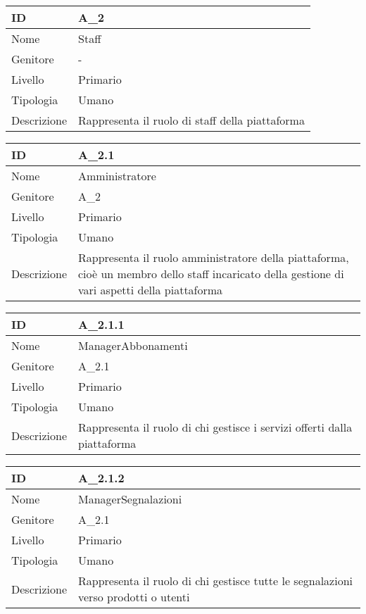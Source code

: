 \begin{center}
\begin{tabular}{ |p{2cm}|p{10cm}|  }
\hline
ID & A\_2 \\\hline
Nome & Staff\\\hline
Genitore & -\\\hline
Livello &  Primario \\\hline
Tipologia & Umano \\\hline
Descrizione &  Rappresenta il ruolo di staff della piattaforma \\\hline
\end{tabular}
\label{table_attore:2}\newline

\begin{tabular}{ |p{2cm}|p{10cm}|  }
\hline
ID & A\_2.1 \\\hline
Nome & Amministratore\\\hline
Genitore & A\_2\\\hline
Livello &  Primario \\\hline
Tipologia & Umano \\\hline
Descrizione &  Rappresenta il ruolo amministratore della piattaforma, cioè un membro dello staff incaricato della gestione di vari aspetti della piattaforma \\\hline
\end{tabular}
\label{table_attore:2.1}\newline

\begin{tabular}{ |p{2cm}|p{10cm}|  }
\hline
ID & A\_2.1.1 \\\hline
Nome & ManagerAbbonamenti\\\hline
Genitore & A\_2.1\\\hline
Livello &  Primario \\\hline
Tipologia & Umano \\\hline
Descrizione &  Rappresenta il ruolo di chi gestisce i servizi offerti dalla piattaforma \\\hline
\end{tabular}
\label{table_attore:2.1.1}\newline

\begin{tabular}{ |p{2cm}|p{10cm}|  }
\hline
ID & A\_2.1.2 \\\hline
Nome & ManagerSegnalazioni\\\hline
Genitore & A\_2.1\\\hline
Livello &  Primario \\\hline
Tipologia & Umano \\\hline
Descrizione &  Rappresenta il ruolo di chi gestisce tutte le segnalazioni verso prodotti o utenti \\\hline
\end{tabular}
\label{table_attore:2.1.2}\newline


\end{center}
